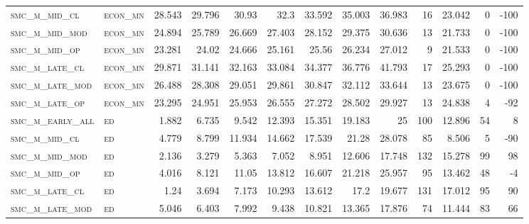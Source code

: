 \begin{landscape}
\begin{center}
\begin{footnotesize}
\begin{longtable}{llrrrrrrrr|rrr}
\textsc{smc\_m\_mid\_cl   } & \textsc{econ\_mn  }   & 28.543   & 29.796   & 30.93    & 32.3     & 33.592   & 35.003   & 36.983   & 16     & 23.042        & 0             & -100            \\
\textsc{smc\_m\_mid\_mod  } & \textsc{econ\_mn  }   & 24.894   & 25.789   & 26.669   & 27.403   & 28.152   & 29.375   & 30.636   & 13     & 21.733        & 0             & -100            \\
\textsc{smc\_m\_mid\_op   } & \textsc{econ\_mn  }   & 23.281   & 24.02    & 24.666   & 25.161   & 25.56    & 26.234   & 27.012   & 9      & 21.533        & 0             & -100            \\
\textsc{smc\_m\_late\_cl  } & \textsc{econ\_mn  }   & 29.871   & 31.141   & 32.163   & 33.084   & 34.377   & 36.776   & 41.793   & 17     & 25.293        & 0             & -100            \\
\textsc{smc\_m\_late\_mod } & \textsc{econ\_mn  }   & 26.488   & 28.308   & 29.051   & 29.861   & 30.847   & 32.112   & 33.644   & 13     & 23.675        & 0             & -100            \\
\textsc{smc\_m\_late\_op  } & \textsc{econ\_mn  }   & 23.295   & 24.951   & 25.953   & 26.555   & 27.272   & 28.502   & 29.927   & 13     & 24.838        & 4             & -92             \\
\textsc{smc\_m\_early\_all} & \textsc{ed        }   & 1.882    & 6.735    & 9.542    & 12.393   & 15.351   & 19.183   & 25       & 100    & 12.896        & 54            & 8               \\
\textsc{smc\_m\_mid\_cl   } & \textsc{ed        }   & 4.779    & 8.799    & 11.934   & 14.662   & 17.539   & 21.28    & 28.078   & 85     & 8.506         & 5             & -90             \\
\textsc{smc\_m\_mid\_mod  } & \textsc{ed        }   & 2.136    & 3.279    & 5.363    & 7.052    & 8.951    & 12.606   & 17.748   & 132    & 15.278        & 99            & 98              \\
\textsc{smc\_m\_mid\_op   } & \textsc{ed        }   & 4.016    & 8.121    & 11.05    & 13.812   & 16.607   & 21.218   & 25.957   & 95     & 13.462        & 48            & -4              \\
\textsc{smc\_m\_late\_cl  } & \textsc{ed        }   & 1.24     & 3.694    & 7.173    & 10.293   & 13.612   & 17.2     & 19.677   & 131    & 17.012        & 95            & 90              \\
\textsc{smc\_m\_late\_mod } & \textsc{ed        }   & 5.046    & 6.403    & 7.992    & 9.438    & 10.821   & 13.365   & 17.876   & 74     & 11.444        & 83            & 66              \\

\end{longtable}
\end{footnotesize}
\end{center}
\end{landscape}
